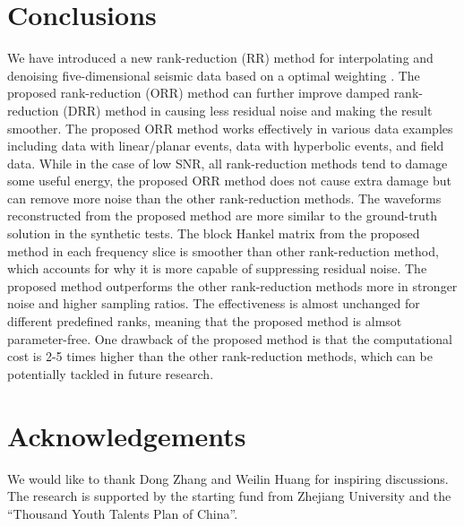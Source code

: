 \section{Conclusions}
We have introduced a new rank-reduction (RR) method for interpolating and denoising five-dimensional seismic data based on a optimal weighting . The proposed  rank-reduction (ORR) method can further improve  damped rank-reduction (DRR) method in causing less residual noise and making the result smoother. The proposed ORR method works effectively in various data examples including data with linear/planar events, data with hyperbolic events, and field data. While in the case of low SNR, all rank-reduction methods tend to damage some useful energy, the proposed ORR method does not cause extra damage but can remove more noise than the other rank-reduction methods. The waveforms reconstructed from the proposed method are more similar to the ground-truth solution in the synthetic tests. The block Hankel matrix from the proposed method in each frequency slice is smoother than other rank-reduction method, which accounts for why it is more capable of suppressing residual noise. The proposed method outperforms the other rank-reduction methods more in stronger noise and higher sampling ratios. The effectiveness is almost unchanged for different predefined ranks, meaning that the proposed method is almsot parameter-free. One drawback of the proposed method is that the computational cost is 2-5 times higher than the other rank-reduction methods, which can be potentially tackled in future research.


\section{Acknowledgements}
We would like to thank Dong Zhang and Weilin Huang for inspiring discussions.  The research is supported by the starting fund from Zhejiang University and the ``Thousand Youth Talents Plan of China''.



